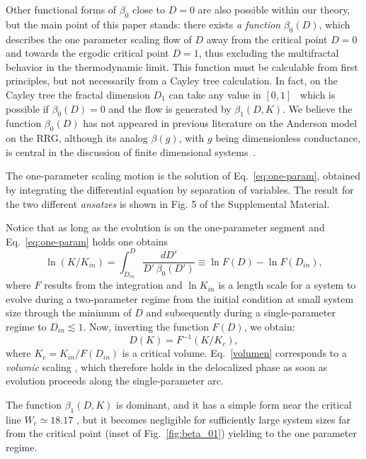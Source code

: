 \documentclass[reprint,aps,prl,superscriptaddress,english,nolongbibliography]{revtex4-1}
\begin{document}
Other functional forms of $\beta_0$ close to $D=0$ are also possible within our theory, but the main point of this paper stands: there exists {\it a function} $\beta_0(D)$, which describes the one parameter scaling flow of $D$ away from the critical point $D=0$ and towards the ergodic critical point $D=1$, thus excluding the multifractal behavior in the thermodynamic limit. This function must be calculable from first principles, but not necessarily from a Cayley tree calculation. In fact, on the Cayley tree the fractal dimension $D_1$ can take any value in $[0,1]$~\cite{monthus2011anderson,tikhonov2016fractality} which is possible if $\beta_0(D)=0$ and the flow is generated by $\beta_1(D,K)$. We believe the function $\beta_0(D)$ has not appeared in previous literature on the Anderson model on the RRG, although its analog $\beta(g)$, with $g$ being dimensionless conductance, is central in the discussion of finite dimensional systems~\cite{abrahams1979scaling}.

The one-parameter scaling motion is the solution of Eq.~\eqref{eq:one-param}, obtained by integrating the differential equation by separation of variables. The result for the two different {\it ansatzes} is shown in Fig. 5 of the Supplemental Material. 

Notice that as long as the evolution is on the one-parameter segment and Eq.~\eqref{eq:one-param} holds one obtains
\begin{equation}
\ln(K/K_{in})=\int_{D_{in}}^{D}\frac{dD'}{D'\,\beta_{0}(D')}\equiv\ln F(D)-\ln F(D_{in}),
\end{equation}
where $F$ results from the integration and $\ln K_{in}$ is a length scale for a system to evolve during a two-parameter regime from the initial condition at small system size through the minimum of $D$ and subsequently during a single-parameter regime to $D_{in}\lesssim 1$. Now, inverting the function $F(D)$, we obtain:
\begin{equation}\label{volumen}
D(K)=F^{-1}(K/K_{c}),
\end{equation}  
where $K_{c}=K_{in}/F(D_{in})$ is a critical volume. Eq.~\eqref{volumen} corresponds to a {\it volumic} scaling  \cite{Mata2017Scaling}, which therefore holds in the delocalized phase as soon as evolution proceeds along the single-parameter arc.
 
The function $\beta_1(D,K)$ is dominant, and it has a simple form near the critical line $W_c \simeq 18.17$ \cite{Tikhonov2019Critical,parisi2019anderson}, but it becomes negligible for sufficiently large system sizes far from the critical point (inset of Fig.~\ref{fig:beta_01}) yielding to the one parameter regime. 
\end{document}
